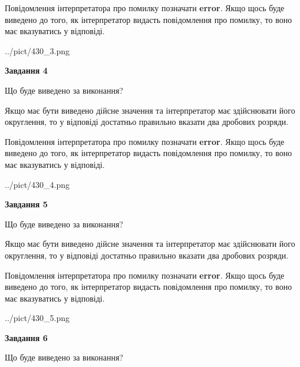 \documentclass[12pt, ukrainian]{article}
\begin{document}
{\begin {Large}
Повідомлення інтерпретатора про помилку позначати \textbf{error}.
Якщо щось буде виведено до того, як інтерпретатор видасть повідомлення про помилку, 
то воно має вказуватись у відповіді. \par

\begin{center}
	{../pict/430_3.png}
\end{center}
\newpage

{\begin {center}\textbf{Завдання 4}\end {center}}\par
Що буде виведено за виконання? \par

Якщо має бути виведено дійсне значення та інтерпретатор має здійснювати його округлення, 
то у відповіді достатньо правильно вказати два дробових розряди.

Повідомлення інтерпретатора про помилку позначати \textbf{error}.
Якщо щось буде виведено до того, як інтерпретатор видасть повідомлення про помилку, 
то воно має вказуватись у відповіді. \par

\begin{center}
	{../pict/430_4.png}
\end{center}
\newpage

{\begin {center}\textbf{Завдання 5}\end {center}}\par
Що буде виведено за виконання? \par

Якщо має бути виведено дійсне значення та інтерпретатор має здійснювати його округлення, 
то у відповіді достатньо правильно вказати два дробових розряди.

Повідомлення інтерпретатора про помилку позначати \textbf{error}.
Якщо щось буде виведено до того, як інтерпретатор видасть повідомлення про помилку, 
то воно має вказуватись у відповіді. \par

\begin{center}
	{../pict/430_5.png}
\end{center}
\newpage

{\begin {center}\textbf{Завдання 6}\end {center}}\par
Що буде виведено за виконання? \par


\end{Large}}
\end{document}
